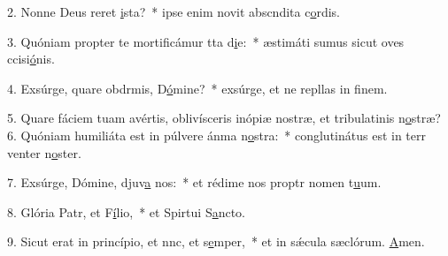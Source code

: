 2. Nonne Deus reret \uline{i}sta?~* ipse enim novit abscndita c\uline{o}rdis.\par 
3. Quóniam propter te mortificámur tta d\uline{i}e:~* æstimáti sumus sicut oves ccisi\uline{ó}nis.\par 
4. Exsúrge, quare obdrmis, D\uline{ó}mine?~* exsúrge, et ne repllas in f\uline{i}nem.\par 
5. Quare fáciem tuam avértis, oblivísceris inópiæ nostræ, et tribulatinis n\uline{o}stræ?
6. Quóniam humiliáta est in púlvere ánma n\uline{o}stra:~* conglutinátus est in terr venter n\uline{o}ster.\par 
7. Exsúrge, Dómine, djuv\uline{a} nos:~* et rédime nos proptr nomen t\uline{u}um.\par 
8. Glória Patr, et F\uline{í}lio,~* et Spirtui S\uline{a}ncto.\par 
9. Sicut erat in princípio, et nnc, et s\uline{e}mper,~* et in sǽcula sæclórum. \uline{A}men.\par 
